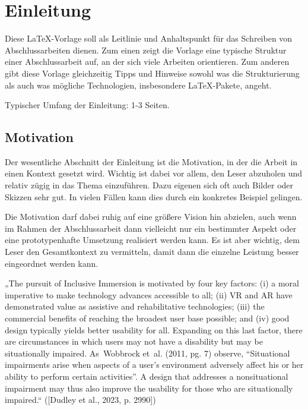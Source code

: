 \chapter{Einleitung}


Diese \LaTeX-Vorlage soll als Leitlinie und Anhaltspunkt für das Schreiben von Abschlussarbeiten dienen. Zum einen zeigt die Vorlage eine typische Struktur einer Abschlussarbeit auf, an der sich viele Arbeiten orientieren. Zum anderen gibt diese Vorlage gleichzeitig Tipps und Hinweise sowohl was die Strukturierung als auch was mögliche Technologien, insbesondere \LaTeX-Pakete, angeht.

Typischer Umfang der Einleitung: 1-3 Seiten.

\section{Motivation}

Der wesentliche Abschnitt der Einleitung ist die Motivation, in der die Arbeit in einen Kontext gesetzt wird. Wichtig ist dabei vor allem, den Leser abzuholen und relativ zügig in das Thema einzuführen. Dazu eigenen sich oft auch Bilder oder Skizzen sehr gut. In vielen Fällen kann dies durch ein konkretes Beispiel gelingen.

Die Motivation darf dabei ruhig auf eine größere Vision hin abzielen, auch wenn im Rahmen der Abschlussarbeit dann vielleicht nur ein bestimmter Aspekt oder eine prototypenhafte Umsetzung realisiert werden kann. Es ist aber wichtig, dem Leser den Gesamtkontext zu vermitteln, damit dann die einzelne Leistung besser eingeordnet werden kann.

„The pursuit of Inclusive Immersion is motivated by four key factors: (i) a moral imperative to make technology advances accessible to all; (ii) VR and AR have demonstrated value as assistive and rehabilitative technologies; (iii) the commercial benefits of reaching the broadest user base possible; and (iv) good design typically yields better usability for all. Expanding on this last factor, there are circumstances in which users may not have a disability but may be situationally impaired. As Wobbrock et al. (2011, pg. 7) observe, “Situational impairments arise when aspects of a user’s environment adversely affect his or her ability to perform certain activities”. A design that addresses a nonsituational impairment may thus also improve the usability for those who are situationally impaired.“ ([Dudley et al., 2023, p. 2990])

